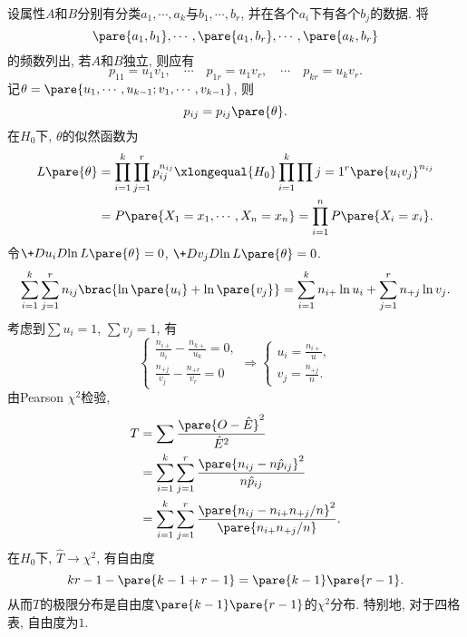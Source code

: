 \documentclass[../Statistics.tex]{subfiles}
\begin{document}
设属性$A$和$B$分别有分类$a_1,\cdots,a_k$与$b_1,\cdots,b_r$, 并在各个$a_i$下有各个$b_j$的数据. 将
\[ \pare{a_1,b_1},\cdots,\pare{a_1,b_r},\cdots,\pare{a_k,b_r} \]
的频数列出, 若$A$和$B$独立, 则应有
\[ p_{11} = u_1v_1,\quad \cdots\quad p_{1r} = u_1v_r,\quad \cdots\quad p_{kr} = u_kv_r. \]
记$\theta = \pare{u_1,\cdots,u_{k-1};v_1,\cdots,v_{k-1}}$, 则
\[ p_{ij} = p_{ij}\pare{\theta}. \]
在$H_0$下, $\theta$的似然函数为
\begin{align*}
    L\pare{\theta} &= \prod_{i=1}^k \prod_{j=1}^r p_{ij}^{n_{ij}} \xlongequal{H_0} \prod_{i=1}^k \prod{j=1}^r \pare{u_i v_j}^{n_{ij}} \\
    &= P\pare{X_1 = x_1,\cdots,X_n = x_n} = \prod_{i=1}^n P\pare{X_i = x_i}.
\end{align*}
令$\displaystyle \+D{u_i}D{\ln L\pare{\theta}} = 0$, $\displaystyle \+D{v_j}D{\ln L\pare{\theta}} = 0$.
\[ \sum_{i=1}^k \sum_{j=1}^r n_{ij}\brac{\ln\pare{u_i} + \ln\pare{v_j}} = \sum_{i=1}^k n_{i+}\ln u_i + \sum_{j=1}^r n_{+j}\ln v_j. \]
考虑到$\sum u_i = 1$, $\sum v_j = 1$, 有
\[ \left\{\begin{aligned}
    \frac{n_{i+}}{u_i} - \frac{n_{k+}}{u_k} = 0, \\
    \frac{n_{+j}}{v_j} - \frac{n_{+r}}{v_r} = 0
\end{aligned}\right. \Rightarrow \left\{ \begin{aligned}
    u_i = \frac{n_{i+}}{u}, \\
    v_j = \frac{n_{+j}}{n}.
\end{aligned} \right. \]
由Pearson $\chi^2$检验,
\begin{align*}
    T &= \sum \frac{\pare{O-\hat E}^2}{\hat E^2} \\
    &= \sum_{i=1}^k \sum_{j=1}^r \frac{\pare{n_{ij} - n\hat p_{ij}}^2}{n\hat p_{ij}} \\
    &= \sum_{i=1}^k \sum_{j=1}^r \frac{\pare{n_{ij} - n_{i+}n_{+j}/n}^2}{\pare{n_{i+}n_{+j}/n}}.
\end{align*}
在$H_0$下, $\hat T \rightarrow \chi^2$, 有自由度
\[ kr - 1 - \pare{k-1 + r - 1} = \pare{k-1}\pare{r-1}. \]
从而$T$的极限分布是自由度$\pare{k-1}\pare{r-1}$的$\chi^2$分布. 特别地, 对于四格表, 自由度为$1$.
\end{document}
